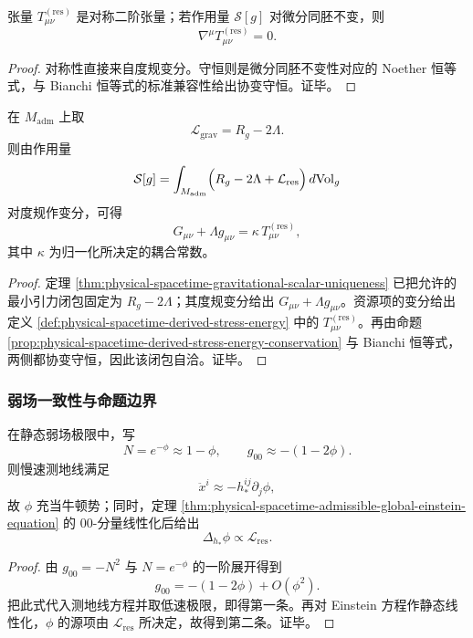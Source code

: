 \begin{proposition}[对称性与守恒]\label{prop:physical-spacetime-derived-stress-energy-conservation}
张量 \(T^{(\mathrm{res})}_{\mu\nu}\) 是对称二阶张量；若作用量 \(\mathcal S[g]\) 对微分同胚不变，则
\[
\nabla^\mu T^{(\mathrm{res})}_{\mu\nu}=0.
\]
\end{proposition}
\begin{proof}
对称性直接来自度规变分。守恒则是微分同胚不变性对应的 Noether 恒等式，与 Bianchi 恒等式的标准兼容性给出协变守恒。证毕。
\end{proof}

\begin{theorem}\label{thm:physical-spacetime-admissible-global-einstein-equation}
在 \(M_{\mathrm{adm}}\) 上取
\[
\mathcal L_{\mathrm{grav}}=R_g-2\Lambda.
\]
则由作用量
\[
\mathcal S[g]
=
\int_{M_{\mathrm{adm}}}\Bigl(R_g-2\Lambda+\mathcal L_{\mathrm{res}}\Bigr)\,d\mathrm{Vol}_g
\]
对度规作变分，可得
\[
G_{\mu\nu}+\Lambda g_{\mu\nu}
=
\kappa\,T^{(\mathrm{res})}_{\mu\nu},
\]
其中 \(\kappa\) 为归一化所决定的耦合常数。
\end{theorem}
\begin{proof}
定理 \ref{thm:physical-spacetime-gravitational-scalar-uniqueness} 已把允许的最小引力闭包固定为 \(R_g-2\Lambda\)；其度规变分给出 \(G_{\mu\nu}+\Lambda g_{\mu\nu}\)。资源项的变分给出定义 \ref{def:physical-spacetime-derived-stress-energy} 中的 \(T^{(\mathrm{res})}_{\mu\nu}\)。再由命题 \ref{prop:physical-spacetime-derived-stress-energy-conservation} 与 Bianchi 恒等式，两侧都协变守恒，因此该闭包自洽。证毕。
\end{proof}

\subsubsection{弱场一致性与命题边界}

\begin{corollary}\label{cor:physical-spacetime-weak-field-redshift-potential}
在静态弱场极限中，写
\[
N=e^{-\phi}\approx 1-\phi,
\qquad
g_{00}\approx -(1-2\phi).
\]
则慢速测地线满足
\[
\ddot x^i\approx -h_\ast^{ij}\partial_j\phi,
\]
故 \(\phi\) 充当牛顿势；同时，定理 \ref{thm:physical-spacetime-admissible-global-einstein-equation} 的 \(00\)-分量线性化后给出
\[
\Delta_{h_\ast}\phi\propto \mathcal L_{\mathrm{res}}.
\]
\end{corollary}
\begin{proof}
由 \(g_{00}=-N^2\) 与 \(N=e^{-\phi}\) 的一阶展开得到
\[
g_{00}=-(1-2\phi)+O(\phi^2).
\]
把此式代入测地线方程并取低速极限，即得第一条。再对 Einstein 方程作静态线性化，\(\phi\) 的源项由 \(\mathcal L_{\mathrm{res}}\) 所决定，故得到第二条。证毕。
\end{proof}

